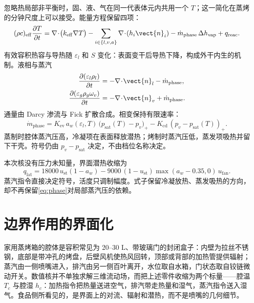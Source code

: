 忽略热局部非平衡时，固、液、气在同一代表体元内共用一个 \(T\)；这一简化在蒸烤的分钟尺度上可以接受。能量方程保留四项：
\begin{equation}
\label{eq:energy}
(\rho c)_{\mathrm{eff}}\frac{\partial T}{\partial t}
=\nabla\!\cdot\!\big(k_{\mathrm{eff}}\nabla T\big)
-\sum_{i\in\{l,v,a\}}\nabla\!\cdot\!(h_i\vect{n}_i)
-\dot m_{\mathrm{phase}}\,\Delta h_{\mathrm{vap}}
+q_{\mathrm{reac}}.
\end{equation}
有效容积热容与导热随 \(\varepsilon_l\) 和 \(S\) 变化：表面变干后导热下降，构成外干内生的机制。液相与蒸汽
\begin{align}
\label{eq:liquid}
\frac{\partial(\varepsilon_l\rho_l)}{\partial t}
&=-\nabla\!\cdot\!\vect{n}_l-\dot m_{\mathrm{phase}},\\
\label{eq:vapor}
\frac{\partial(\varepsilon_g\rho_g\omega_v)}{\partial t}
&=-\nabla\!\cdot\!\vect{n}_v+\dot m_{\mathrm{phase}}.
\end{align}
通量由 Darcy 渗流与 Fick 扩散合成。相变保持有限速率：
\begin{equation}
\label{eq:phase}
\dot m_{\mathrm{phase}}
=K_{\mathrm{ev}}\,a_w(\varepsilon_l,T)\,
\big(p_{\mathrm{sat}}(T)-p_v\big)_+
-K_{\mathrm{cd}}\,(p_v-p_{\mathrm{sat}}(T))_+.
\end{equation}
蒸制时腔体蒸汽压高，冷凝项在表面释放潜热；烤制时蒸汽压低，蒸发项吸热并留下干壳。符号仍由 \(p_v-p_{\mathrm{sat}}\) 决定，不由档位名称决定。

本次核没有压力未知量，界面潜热收缩为
\begin{equation}
\label{eq:qlat}
q_{\mathrm{lat}}=18000\,u_{\mathrm{st}}(1-a_w)-9000\,(1-u_{\mathrm{st}})\max(a_w-0.35,0)\,u_{\mathrm{fan}}.
\end{equation}
蒸汽指令直接决定符号，活度只调制幅度。式子保留冷凝放热、蒸发吸热的方向，却不再保留\eqref{eq:phase}对局部蒸汽压的依赖。

\section{边界作用的界面化}

家用蒸烤箱的腔体是容积常见为 20--30 L、带玻璃门的封闭盒子：内壁为拉丝不锈钢，底部是带冲孔的烤盘，后壁风机使热风回转，顶部或背部的加热管提供辐射；蒸汽由一侧喷嘴进入，排汽由另一侧百叶离开，水位取自水箱，门状态取自铰链微动开关。数值核并不单独求解三维流动场，而把上述零件收缩为两个标量——腔温 \(T_c\) 与腔湿 \(h_c\)：加热指令把热量送进空气，排汽带走热量和湿气，蒸汽指令送入湿气。食品侧所看见的，是界面上的对流、辐射和潜热，而不是喷嘴的几何细节。

